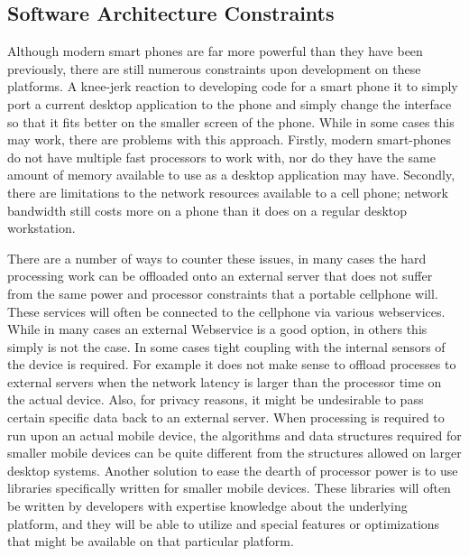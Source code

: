 \documentclass{acm_proc_article-sp}
\begin{document}
\subsection{Software Architecture Constraints}
Although modern smart phones are far more powerful than they have been previously, there are still numerous constraints upon development on these platforms.  A knee-jerk reaction to developing code for a smart phone it to simply port a current desktop application to the phone and simply change the interface so that it fits better on the smaller screen of the phone.  While in some cases this may work, there are problems with this approach.  Firstly, modern smart-phones do not have multiple fast processors to work with, nor do they have the same amount of memory available to use as a desktop application may have.  Secondly, there are limitations to the network resources available to a cell phone; network bandwidth still costs more on a phone than it does on a regular desktop workstation.  \cite{wagner2009making}  

There are a number of ways to counter these issues, in many cases the hard processing work can be offloaded onto an external server that does not suffer from the same power and processor constraints that a portable cellphone will. These services will often be connected to the cellphone via various webservices. While in many cases an external Webservice is a good option, in others this simply is not the case. In some cases tight coupling with the internal sensors of the device is required.  For example it does not make sense to offload processes to external servers when the network latency is larger than the processor time on the actual device.  Also, for privacy reasons, it might be undesirable to pass certain specific data back to an external server. When processing is required to run upon an actual mobile device, the algorithms and data structures required for smaller mobile devices can be quite different from the structures allowed on larger desktop systems.  \cite{wagner2009making} Another solution to ease the dearth of processor power is to use libraries specifically written for smaller mobile devices.  These libraries will often be written by developers with expertise knowledge about the underlying platform, and they will be able to utilize and special features or optimizations that might be available on that particular platform.  
\end{document}

